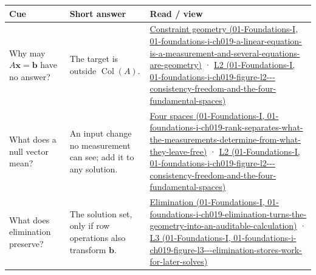 {\def\LTcaptype{none} %
\begin{longtable}[]{@{}
  >{\raggedright\arraybackslash}p{}
  >{\raggedright\arraybackslash}p{}
  >{\raggedright\arraybackslash}p{}@{}}
\toprule\noalign{}
\begin{minipage}[b]{\linewidth}\raggedright
Cue
\end{minipage} & \begin{minipage}[b]{\linewidth}\raggedright
Short answer
\end{minipage} & \begin{minipage}[b]{\linewidth}\raggedright
Read / view
\end{minipage} \\
\midrule\noalign{}
\endhead
\bottomrule\noalign{}
\endlastfoot
Why may \(A\mathbf x=\mathbf b\) have no answer? & The target is outside \(\operatorname{Col}(A)\). & \href{../01-Foundations-I/main.pdf\#nameddest=01-foundations-i-ch019-a-linear-equation-is-a-measurement-and-several-equations-are-geometry}{Constraint geometry (01-Foundations-I, 01-foundations-i-ch019-a-linear-equation-is-a-measurement-and-several-equations-are-geometry)} · \href{../01-Foundations-I/main.pdf\#nameddest=01-foundations-i-ch019-figure-l2---consistency-freedom-and-the-four-fundamental-spaces}{L2 (01-Foundations-I, 01-foundations-i-ch019-figure-l2-\/-\/-consistency-freedom-and-the-four-fundamental-spaces)} \\
What does a null vector mean? & An input change no measurement can see; add it to any solution. & \href{../01-Foundations-I/main.pdf\#nameddest=01-foundations-i-ch019-rank-separates-what-the-measurements-determine-from-what-they-leave-free}{Four spaces (01-Foundations-I, 01-foundations-i-ch019-rank-separates-what-the-measurements-determine-from-what-they-leave-free)} · \href{../01-Foundations-I/main.pdf\#nameddest=01-foundations-i-ch019-figure-l2---consistency-freedom-and-the-four-fundamental-spaces}{L2 (01-Foundations-I, 01-foundations-i-ch019-figure-l2-\/-\/-consistency-freedom-and-the-four-fundamental-spaces)} \\
What does elimination preserve? & The solution set, only if row operations also transform \(\mathbf b\). & \href{../01-Foundations-I/main.pdf\#nameddest=01-foundations-i-ch019-elimination-turns-the-geometry-into-an-auditable-calculation}{Elimination (01-Foundations-I, 01-foundations-i-ch019-elimination-turns-the-geometry-into-an-auditable-calculation)} · \href{../01-Foundations-I/main.pdf\#nameddest=01-foundations-i-ch019-figure-l3---elimination-stores-work-for-later-solves}{L3 (01-Foundations-I, 01-foundations-i-ch019-figure-l3-\/-\/-elimination-stores-work-for-later-solves)} \\

\end{longtable}}
